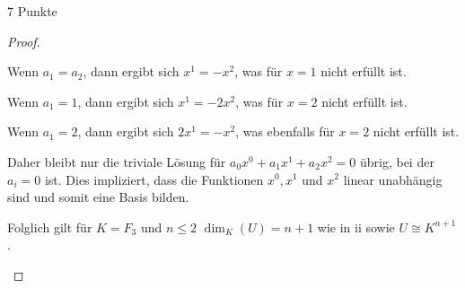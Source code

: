 \documentclass{problemset}
\begin{document}
\begin{problem}{7 Punkte}
\begin{proof}
\begin{enumerate}
              Wenn $a_1 = a_2$, dann ergibt sich $x^1 = - x^2$, was für $x = 1$
              nicht erfüllt ist.

              Wenn $a_1 = 1$, dann ergibt sich $x^1 = -2x^2$, was für $x = 2$
              nicht erfüllt ist.

              Wenn $a_1 = 2$, dann ergibt sich $2x^1 = -x^2$, was ebenfalls für
              $x = 2$ nicht erfüllt ist.

              Daher bleibt nur die triviale Lösung für $a_0x^0 + a_1x^1 +
              a_2x^2 = 0$ übrig, bei der $a_i = 0$ ist. Dies impliziert, dass
              die Funktionen $x^0, x^1$ und $x^2$ linear unabhängig sind und
              somit eine Basis bilden.

              Folglich gilt für $K = F_3$ und $n \leq 2$ $\dim_K(U) = n + 1$
              wie in ii sowie $U \cong K^{n+1}$.
    \end{enumerate}
\end{proof}

\end{problem}
\end{document}
